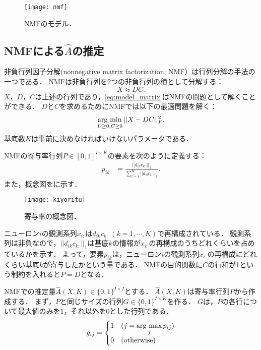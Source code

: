 \begin{figure}[htbp]
	\centering
	\texttt{[image: nmf]}
	\caption{NMFのモデル．}
	\label{fig:nmf}
\end{figure}

\subsection{NMFによる$\hat{A}$の推定}
非負行列因子分解(nonnegative matrix factorization; NMF）\cite{Lee1999}は行列分解の手法の一つである．
NMFは非負行列を2つの非負行列の積として分解する：
\begin{equation}
	X \approx DC.
\end{equation}
$X$，$D$，$C$は上述の行列であり，\eqref{eq:model_matrix}はNMFの問題として解くことができる．
$D$と$C$を求めるためにNMFでは以下の最適問題を解く：
\begin{equation}
	\mathop{\textrm{arg~min}}\limits_{D \geq 0, C \geq 0} ||X - DC||_F^2.
\end{equation}
基底数$K$は事前に決めなければいけないパラメータである．

NMFの寄与率行列$P \in [0,1]^{I \times K}$の要素を次のように定義する：
\begin{align}
	p_{ik} &= \frac{||d_{ik} c_{k:}||_1}{\sum_{l=1}^K || d_{il} c_{l:} ||_1}.
\end{align}
また，概念図をに示す．
\begin{figure}[htbp]
	\centering
	\texttt{[image: kiyoritu]}
	\caption{寄与率の概念図．}
	\label{fig:kiyoritu}
\end{figure}
ニューロン$i$の観測系列$x_{i:}$は$d_{ik}c_{k:} \ (k=1,\cdots,K)$で再構成されている．
観測系列は非負なので，$||d_{ik}c_{k:}||_1$は基底$k$の情報が$x_{i:}$の再構成のうちどれくらいを占めているかを示す．
よって，要素$p_{ik}$は，ニューロン$i$の観測系列$x_{i:}$の再構成にどれくらい基底$k$が寄与したかという量である．
NMFの目的関数に$C$の行和が1という制約を入れると$P=D$となる．

NMFでの推定量$\hat{A}(X,K) \in \{0,1\}^{I \times I}$とする．
$\hat{A}(X,K)$は寄与率行列$P$から作成する．
まず，$P$と同じサイズの行列$G \in \{0, 1\}^{I \times K}$を作る．
$G$は，$P$の各行について最大値のみを$1$，それ以外を$0$とした行列である．
\begin{align}
	g_{ij} = \begin{cases}
		1 & (j = \mathop{\textrm{arg~max}}\limits_{j}p_{ij}) \\
		0 & (\text{otherwise})
	\end{cases}
\end{align}

